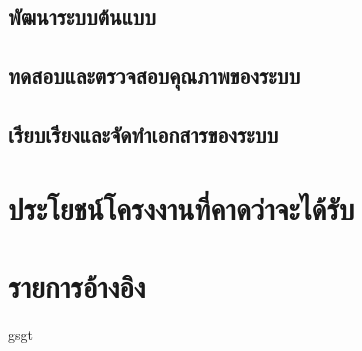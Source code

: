 \documentclass[a4paper]{article}
\begin{document}
\subsection{พัฒนาระบบต้นแบบ}
\subsection{ทดสอบและตรวจสอบคุณภาพของระบบ}
\subsection{เรียบเรียงและจัดทําเอกสารของระบบ}

\section{ประโยชน์โครงงานที่คาดว่าจะได้รับ}

\section{รายการอ้างอิง}

\label{pap:1}
\label{pap:2}
gsgt
\end{document}
